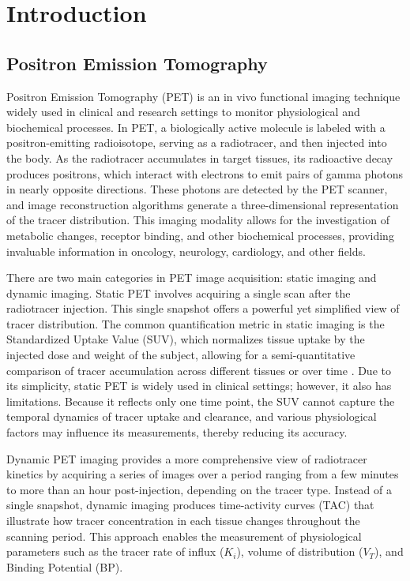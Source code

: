 \chapter{Introduction}
\section{Positron Emission Tomography}
Positron Emission Tomography (PET) is an in vivo functional imaging technique widely used in clinical and research settings to monitor physiological and biochemical processes.
In PET, a biologically active molecule is labeled with a positron-emitting radioisotope, serving as a radiotracer, and then injected into the body.
As the radiotracer accumulates in target tissues, its radioactive decay produces positrons, which interact with electrons to emit pairs of gamma photons in nearly opposite directions.
These photons are detected by the PET scanner, and image reconstruction algorithms generate a three-dimensional representation of the tracer distribution.
This imaging modality allows for the investigation of metabolic changes, receptor binding, and other biochemical processes, providing invaluable information in oncology, neurology, cardiology, and other fields.

There are two main categories in PET image acquisition: static imaging and dynamic imaging.
Static PET involves acquiring a single scan after the radiotracer injection.
This single snapshot offers a powerful yet simplified view of tracer distribution.
The common quantification metric in static imaging is the Standardized Uptake Value (SUV), which normalizes tissue uptake by the injected dose and weight of the subject, allowing for a semi-quantitative comparison of tracer accumulation across different tissues or over time \cite{keyes1995suv}.
Due to its simplicity, static PET is widely used in clinical settings; however, it also has limitations.
Because it reflects only one time point, the SUV cannot capture the temporal dynamics of tracer uptake and clearance, and various physiological factors may influence its measurements, thereby reducing its accuracy.

Dynamic PET imaging provides a more comprehensive view of radiotracer kinetics by acquiring a series of images over a period ranging from a few minutes to more than an hour post-injection, depending on the tracer type.
Instead of a single snapshot, dynamic imaging produces time-activity curves (TAC) that illustrate how tracer concentration in each tissue changes throughout the scanning period.
This approach enables the measurement of physiological parameters such as the tracer rate of influx (\(K_i\)), volume of distribution (\(V_T\)), and Binding Potential (BP).

